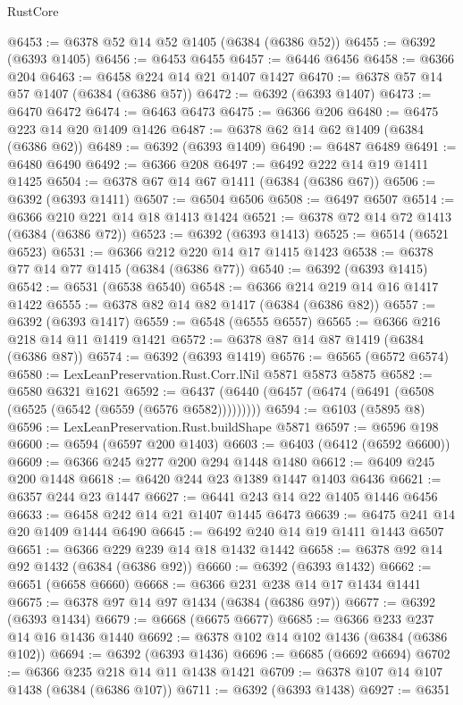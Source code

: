 \begin{lexlean}{RustCore}
\begin{coremodule}
@6453 := @6378 @52 @14 @52 @1405 (@6384 (@6386 @52))
@6455 := @6392 (@6393 @1405)
@6456 := @6453 @6455
@6457 := @6446 @6456
@6458 := @6366 @204
@6463 := @6458 @224 @14 @21 @1407 @1427
@6470 := @6378 @57 @14 @57 @1407 (@6384 (@6386 @57))
@6472 := @6392 (@6393 @1407)
@6473 := @6470 @6472
@6474 := @6463 @6473
@6475 := @6366 @206
@6480 := @6475 @223 @14 @20 @1409 @1426
@6487 := @6378 @62 @14 @62 @1409 (@6384 (@6386 @62))
@6489 := @6392 (@6393 @1409)
@6490 := @6487 @6489
@6491 := @6480 @6490
@6492 := @6366 @208
@6497 := @6492 @222 @14 @19 @1411 @1425
@6504 := @6378 @67 @14 @67 @1411 (@6384 (@6386 @67))
@6506 := @6392 (@6393 @1411)
@6507 := @6504 @6506
@6508 := @6497 @6507
@6514 := @6366 @210 @221 @14 @18 @1413 @1424
@6521 := @6378 @72 @14 @72 @1413 (@6384 (@6386 @72))
@6523 := @6392 (@6393 @1413)
@6525 := @6514 (@6521 @6523)
@6531 := @6366 @212 @220 @14 @17 @1415 @1423
@6538 := @6378 @77 @14 @77 @1415 (@6384 (@6386 @77))
@6540 := @6392 (@6393 @1415)
@6542 := @6531 (@6538 @6540)
@6548 := @6366 @214 @219 @14 @16 @1417 @1422
@6555 := @6378 @82 @14 @82 @1417 (@6384 (@6386 @82))
@6557 := @6392 (@6393 @1417)
@6559 := @6548 (@6555 @6557)
@6565 := @6366 @216 @218 @14 @11 @1419 @1421
@6572 := @6378 @87 @14 @87 @1419 (@6384 (@6386 @87))
@6574 := @6392 (@6393 @1419)
@6576 := @6565 (@6572 @6574)
@6580 := LexLeanPreservation.Rust.Corr.lNil @5871 @5873 @5875
@6582 := @6580 @6321 @1621
@6592 := @6437 (@6440 (@6457 (@6474 (@6491 (@6508 (@6525 (@6542 (@6559 (@6576 @6582)))))))))
@6594 := @6103 (@5895 @8)
@6596 := LexLeanPreservation.Rust.buildShape @5871
@6597 := @6596 @198
@6600 := @6594 (@6597 @200 @1403)
@6603 := @6403 (@6412 (@6592 @6600))
@6609 := @6366 @245 @277 @200 @294 @1448 @1480
@6612 := @6409 @245 @200 @1448
@6618 := @6420 @244 @23 @1389 @1447 @1403 @6436
@6621 := @6357 @244 @23 @1447
@6627 := @6441 @243 @14 @22 @1405 @1446 @6456
@6633 := @6458 @242 @14 @21 @1407 @1445 @6473
@6639 := @6475 @241 @14 @20 @1409 @1444 @6490
@6645 := @6492 @240 @14 @19 @1411 @1443 @6507
@6651 := @6366 @229 @239 @14 @18 @1432 @1442
@6658 := @6378 @92 @14 @92 @1432 (@6384 (@6386 @92))
@6660 := @6392 (@6393 @1432)
@6662 := @6651 (@6658 @6660)
@6668 := @6366 @231 @238 @14 @17 @1434 @1441
@6675 := @6378 @97 @14 @97 @1434 (@6384 (@6386 @97))
@6677 := @6392 (@6393 @1434)
@6679 := @6668 (@6675 @6677)
@6685 := @6366 @233 @237 @14 @16 @1436 @1440
@6692 := @6378 @102 @14 @102 @1436 (@6384 (@6386 @102))
@6694 := @6392 (@6393 @1436)
@6696 := @6685 (@6692 @6694)
@6702 := @6366 @235 @218 @14 @11 @1438 @1421
@6709 := @6378 @107 @14 @107 @1438 (@6384 (@6386 @107))
@6711 := @6392 (@6393 @1438)
@6927 := @6351

\end{coremodule}
\end{lexlean}

